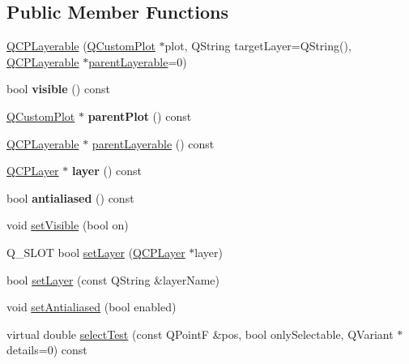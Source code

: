\subsection*{Public Member Functions}
\begin{DoxyCompactItemize}
\item 
\hyperlink{class_q_c_p_layerable_a74c0fa237f29bf0e49565013fc5d1ec0}{Q\+C\+P\+Layerable} (\hyperlink{class_q_custom_plot}{Q\+Custom\+Plot} $\ast$plot, Q\+String target\+Layer=Q\+String(), \hyperlink{class_q_c_p_layerable}{Q\+C\+P\+Layerable} $\ast$\hyperlink{class_q_c_p_layerable_aa78b7e644d2c519e1a9a6f2ac5fcd858}{parent\+Layerable}=0)
\item 
\mbox{\label{class_q_c_p_layerable_af0297b944b6192b6d67d00bff41b6b70}} 
bool {\bfseries visible} () const
\item 
\mbox{\label{class_q_c_p_layerable_a473edb813a4c1929d6b6a8fe3ff3faf7}} 
\hyperlink{class_q_custom_plot}{Q\+Custom\+Plot} $\ast$ {\bfseries parent\+Plot} () const
\item 
\hyperlink{class_q_c_p_layerable}{Q\+C\+P\+Layerable} $\ast$ \hyperlink{class_q_c_p_layerable_aa78b7e644d2c519e1a9a6f2ac5fcd858}{parent\+Layerable} () const
\item 
\mbox{\label{class_q_c_p_layerable_a5ff4862e8c784c9f5986dbc1533ba2a4}} 
\hyperlink{class_q_c_p_layer}{Q\+C\+P\+Layer} $\ast$ {\bfseries layer} () const
\item 
\mbox{\label{class_q_c_p_layerable_a71cbd212fde2703cee076e204a475709}} 
bool {\bfseries antialiased} () const
\item 
void \hyperlink{class_q_c_p_layerable_a3bed99ddc396b48ce3ebfdc0418744f8}{set\+Visible} (bool on)
\item 
Q\+\_\+\+S\+L\+OT bool \hyperlink{class_q_c_p_layerable_ab0d0da6d2de45a118886d2c8e16d5a54}{set\+Layer} (\hyperlink{class_q_c_p_layer}{Q\+C\+P\+Layer} $\ast$layer)
\item 
bool \hyperlink{class_q_c_p_layerable_ab25a0e7b897993b44447caee0f142083}{set\+Layer} (const Q\+String \&layer\+Name)
\item 
void \hyperlink{class_q_c_p_layerable_a4fd43e89be4a553ead41652565ff0581}{set\+Antialiased} (bool enabled)
\item 
virtual double \hyperlink{class_q_c_p_layerable_a04db8351fefd44cfdb77958e75c6288e}{select\+Test} (const Q\+PointF \&pos, bool only\+Selectable, Q\+Variant $\ast$details=0) const

\end{DoxyCompactItemize}
